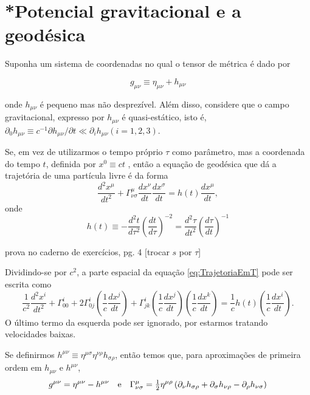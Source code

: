\section{*Potencial gravitacional e a geodésica}\label{sec:PotencialGravitacionalGeodesica}

Suponha um sistema de coordenadas no qual o tensor de métrica é dado por

\begin{equation}\label{eq:TensorMetricaLocal}
g_{\mu \nu} \equiv \eta_{\mu \nu}+h_{\mu \nu}
\end{equation}

onde $ h_{\mu \nu} $ é pequeno mas não desprezível. Além disso, considere que o campo gravitacional, expresso por $ h_{\mu\nu} $ é quasi-estático, isto é, $ \partial_{0} h_{\mu \nu} \equiv c^{-1} \partial h_{\mu \nu} / \partial t \ll \partial_{i} h_{\mu \nu} (i=1,2,3) $.

Se, em vez de utilizarmos o tempo próprio $ \tau $ como parâmetro, mas a coordenada do tempo $ t $, definida por $ x^0 \equiv ct $ 
, então a equação de geodésica que dá a trajetória de uma partícula livre é da forma
\begin{equation}\label{eq:TrajetoriaEmT}
\frac{d^{2} x^{\mu}}{d t^{2}}+\Gamma_{\nu \sigma}^{\mu} \frac{d x^{\nu}}{d t} \frac{d x^{\sigma}}{d t}=h(t) \frac{d x^{\mu}}{d t} ,
\end{equation}
onde
\begin{equation}\label{eq:HDefinicao}
h(t) \equiv-\frac{d^{2} t}{d \tau^{2}}\left(\frac{d t}{d \tau}\right)^{-2}=\frac{d^{2} \tau}{d t^{2}}\left(\frac{d \tau}{d t}\right)^{-1}
\end{equation}

{\color{red} prova no caderno de exercícios, pg. 4 [trocar $ s $ por $ \tau $]}

Dividindo-se por $ c^2 $, a parte espacial da equação \eqref{eq:TrajetoriaEmT} pode ser escrita como
\begin{equation}\label{eq:TrajetoriaParteEspacial}
\frac{1}{c^{2}} \frac{d^{2} x^{i}}{d t^{2}}+\Gamma_{00}^{i}+2 \Gamma_{0 j}^{i}\left(\frac{1}{c} \frac{d x^{j}}{d t}\right)+\Gamma_{j k}^{i}\left(\frac{1}{c} \frac{d x^{j}}{d t}\right)\left(\frac{1}{c} \frac{d x^{k}}{d t}\right)=\frac{1}{c} h(t)\left(\frac{1}{c} \frac{d x^{i}}{d t}\right).
\end{equation}
O último termo da esquerda pode ser ignorado, por estarmos tratando velocidades baixas.

Se definirmos $ h^{\mu \nu} \equiv \eta^{\mu \sigma} \eta^{\nu \rho} h_{\sigma \rho} $, então temos que, para aproximações de primeira ordem em $ h_{\mu \nu} \text { e } h^{\mu \nu} $,
\begin{equation}\label{eq:HCovariante}
g^{\mu \nu}=\eta^{\mu \nu}-h^{\mu \nu} \qq{e} \Gamma_{\nu \sigma}^{\mu}=\tfrac{1}{2} \eta^{\mu \rho}\left(\partial_{\nu} h_{\sigma \rho}+\partial_{\sigma} h_{\nu \rho}-\partial_{\rho} h_{\nu \sigma}\right)
\end{equation}

